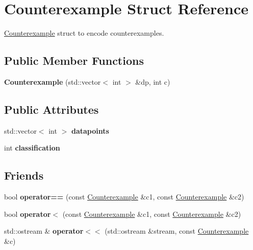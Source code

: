 \hypertarget{structCounterexample}{}\section{Counterexample Struct Reference}
\label{structCounterexample}


\hyperlink{structCounterexample}{Counterexample} struct to encode counterexamples.  


\subsection*{Public Member Functions}
\begin{DoxyCompactItemize}
\item 
\mbox{\label{structCounterexample_ad61919a508b1ea11f1182a25b2b1185e}} 
{\bfseries Counterexample} (std\+::vector$<$ int $>$ \&dp, int c)
\end{DoxyCompactItemize}
\subsection*{Public Attributes}
\begin{DoxyCompactItemize}
\item 
\mbox{\label{structCounterexample_a15f4bdb9016776361e63a942b200a637}} 
std\+::vector$<$ int $>$ {\bfseries datapoints}
\item 
\mbox{\label{structCounterexample_ab79272d7c597224446a206a1abf5ac74}} 
int {\bfseries classification}
\end{DoxyCompactItemize}
\subsection*{Friends}
\begin{DoxyCompactItemize}
\item 
\mbox{\label{structCounterexample_a8af9efd24afb9650e8b336d5c8cf6770}} 
bool {\bfseries operator==} (const \hyperlink{structCounterexample}{Counterexample} \&c1, const \hyperlink{structCounterexample}{Counterexample} \&c2)
\item 
\mbox{\label{structCounterexample_af264b295905bfbfe1438c52333c66e2b}} 
bool {\bfseries operator$<$} (const \hyperlink{structCounterexample}{Counterexample} \&c1, const \hyperlink{structCounterexample}{Counterexample} \&c2)
\item 
\mbox{\label{structCounterexample_ab78e2cc495c1b4d7bc6e7a46b4d7bb61}} 
std\+::ostream \& {\bfseries operator$<$$<$} (std\+::ostream \&stream, const \hyperlink{structCounterexample}{Counterexample} \&c)
\end{DoxyCompactItemize}


